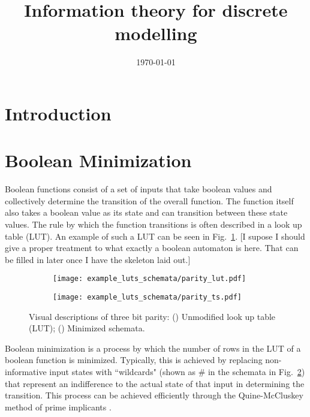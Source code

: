 \documentclass[12pt]{article} %
\newcommand{\figref}[1]{Fig.~\ref{fig:#1}}
\begin{document}

\title{Information theory for discrete modelling} %
\date{\today}
\maketitle %

\section{Introduction}\label{sec:introduction} %


\section{Boolean Minimization}\label{sec:boolmin} %

Boolean functions consist of a set of inputs that take boolean values and 
collectively determine the transition of the overall function. The function 
itself also takes a boolean value as its state and can transition between these
state values. The rule by which the function transitions is often described in a
look up table (LUT). An example of such a LUT can be seen in 
\figref{parity_lut}. [I supose I should give a proper treatment to what exactly
a boolean automaton is here. That can be filled in later once I have the 
skeleton laid out.]

\begin{figure}[h]
    \centering
    \begin{subfigure}[A]{0.48\textwidth}
        \centering
        \texttt{[image: example\_luts\_schemata/parity\_lut.pdf]}
        \label{fig:parity_lut}
        \caption{\label{fig:parity_lut}}
    \end{subfigure}
    \begin{subfigure}[B]{0.48\textwidth}
        \centering
        \texttt{[image: example\_luts\_schemata/parity\_ts.pdf]}
        \label{fig:parity_ts}
        \caption{\label{fig:parity_ts}}
    \end{subfigure}
    \caption{Visual descriptions of three bit parity: 
    () Unmodified look up table (LUT);
    () Minimized schemata.}
    \label{fig:parity}
\end{figure}

Boolean minimization is a process by which the number of rows in the LUT of a
boolean function is minimized. Typically, this is achieved by replacing 
non-informative input states with ``wildcards" (shown as \# in the schemata in
\figref{parity_ts}) that represent an indifference to the actual state of that 
input in determining the transition. This process can be achieved efficiently
through the Quine-McCluskey method of prime implicants \cite{quine_way_1955}.
\end{document}

